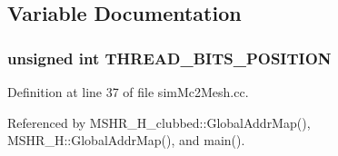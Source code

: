 \subsection{Variable Documentation}
\subsubsection[{THREAD\_\-BITS\_\-POSITION}]{\setlength{\rightskip}{0pt plus 5cm}unsigned int {\bf THREAD\_\-BITS\_\-POSITION}}\label{mshr__clubbed_8cc_581f0c063e972c5f202149f2e3ce7452}




Definition at line 37 of file simMc2Mesh.cc.

Referenced by MSHR\_\-H\_\-clubbed::GlobalAddrMap(), MSHR\_\-H::GlobalAddrMap(), and main().
